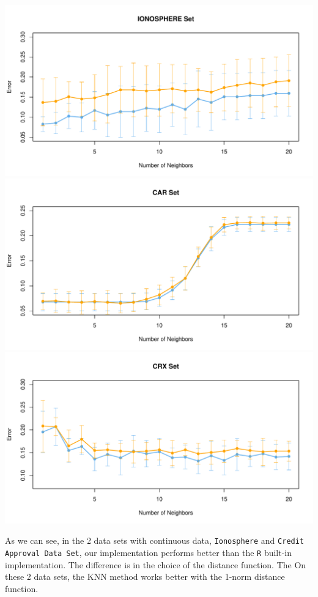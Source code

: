 \documentclass{article}
\newcommand{\code}[1]{\texttt{#1}}
\begin{document}
\begin{center}
    \includegraphics[width=0.9\linewidth]{Images/Prob2/Prob2-3-R_Comp-Iono.pdf}
    \includegraphics[width=0.9\linewidth]{Images/Prob2/Prob2-3-R_Comp-Car.pdf}
    \includegraphics[width=0.9\linewidth]{Images/Prob2/Prob2-3-R_Comp-Crx.pdf}
\end{center}


As we can see, in the 2 data sets with continuous data, \code{Ionosphere} and \code{Credit Approval Data Set}, our implementation performs better than the \code{R} built-in implementation. 
The difference is in the choice of the distance function. The On these 2 data sets, the KNN method works better with the 1-norm distance function. 
\end{document}
